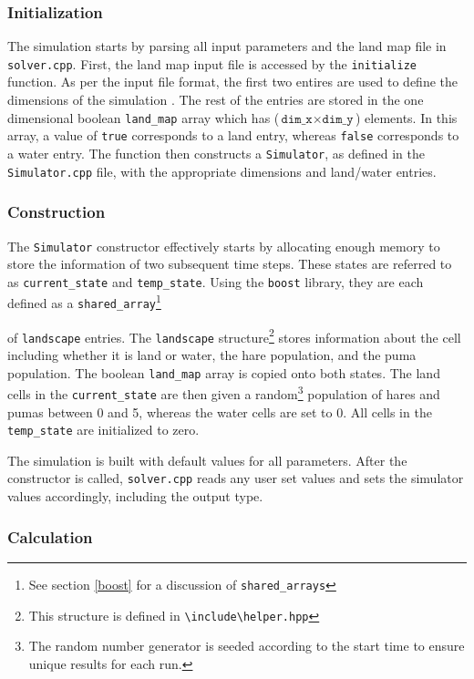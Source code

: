 \documentclass[a4paper,11pt]{article}
\begin{document}
{\subsubsection{Initialization}

The simulation starts by parsing all input parameters and the land map file in \texttt{solver.cpp}.  First, the land map input file is accessed by the \texttt{initialize} function.  As per the input file format, the first two entires are used to define the dimensions of the simulation .  The rest of the entries are stored in the one dimensional boolean \texttt{land\_map} array which has ($\texttt{dim\_x} \times \texttt{dim\_y}$) elements.  In this array, a value of \texttt{true} corresponds to a land entry, whereas \texttt{false} corresponds to a water entry.  The function then constructs a \texttt{Simulator}, as defined in the \texttt{Simulator.cpp} file, with the appropriate dimensions and land/water entries.  

\subsubsection{Construction}

The \texttt{Simulator} constructor effectively starts by allocating enough memory to store the information of two subsequent time steps.  These states are  referred to as \texttt{current\_state} and \texttt{temp\_state}.  Using the \texttt{boost} library, they are each defined as a \texttt{shared\_array}\footnote{See section \ref{boost} for a discussion of \texttt{shared\_arrays}}} of \texttt{landscape} entries.  The \texttt{landscape} structure\footnote{This structure is defined in \texttt{\textbackslash include\textbackslash helper.hpp}} stores information about the cell including whether it is land or water, the hare population, and the puma population. The boolean \texttt{land\_map} array is copied onto both states.  The land cells in the \texttt{current\_state} are then given a random\footnote{The random number generator is seeded according to the start time to ensure unique results for each run.} population of hares and pumas between 0 and 5, whereas the water cells are set to 0.  All cells in the \texttt{temp\_state} are initialized to zero.

The simulation is built with default values for all parameters.  After the constructor is called, \texttt{solver.cpp} reads any user set values and sets the simulator values accordingly, including the output type.

\subsubsection{Calculation}
\end{document}
